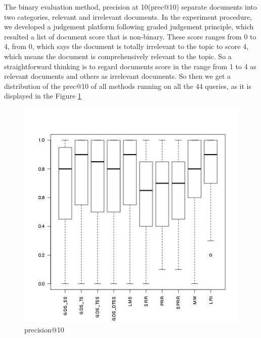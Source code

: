 The binary evaluation method, precision at 10(prec@10) separate documents into two categories, relevant and irrelevant documents. In the experiment procedure, we developed a judgement platform following graded judgement principle, which resulted a list of document score that is non-binary. These score ranges from 0 to 4, from 0, which says the document is totally irrelevant to the topic to score 4, which means the document is comprehensively relevant to the topic. So a straightforward thinking is to regard documents score in the range from 1 to 4 as relevant documents and others as irrelevant documents. So then we get a distribution of the prec@10 of all methods running on all the 44 queries, as it is displayed in the Figure \ref{fig:prec10_dis} 
\begin{figure}
\centering
\includegraphics[scale=0.6]{images/prec10}
\caption{precision@10}
\label{fig:prec10_dis}
\end{figure}
